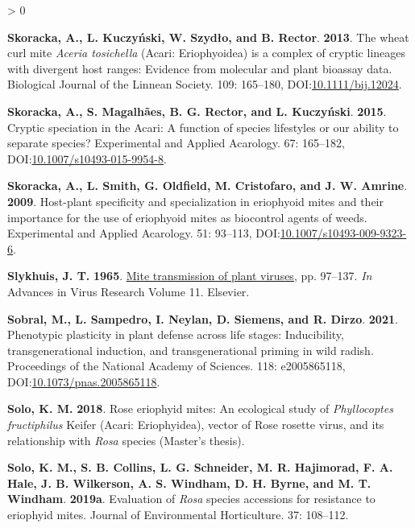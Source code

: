 \documentclass{ufdissertation}[overrideChapters] %
\newlength{\cslhangindent}
\newenvironment{CSLReferences}[2] %
 {%
  \setlength{\parindent}{0pt}
  \ifodd #1 \everypar{\setlength{\hangindent}{\cslhangindent}}\ignorespaces\fi
  \ifnum #2 > 0
  \setlength{\parskip}{#2\baselineskip}
  \fi
 }%
 {}
\begin{document}
{\begin{CSLReferences}{1}{1}
\leavevmode{}%
\textbf{Skoracka, A., L. Kuczyński, W. Szydło, and B. Rector}. \textbf{2013}. The wheat curl mite {\emph{Aceria tosichella}} ({Acari: Eriophyoidea}) is a complex of cryptic lineages with divergent host ranges: Evidence from molecular and plant bioassay data. Biological Journal of the Linnean Society. 109: 165--180, DOI:\href{https://doi.org/10.1111/bij.12024}{10.1111/bij.12024}.

\leavevmode{}%
\textbf{Skoracka, A., S. Magalhães, B. G. Rector, and L. Kuczyński}. \textbf{2015}. Cryptic speciation in the {Acari}: A function of species lifestyles or our ability to separate species? Experimental and Applied Acarology. 67: 165--182, DOI:\href{https://doi.org/10.1007/s10493-015-9954-8}{10.1007/s10493-015-9954-8}.

\leavevmode{}%
\textbf{Skoracka, A., L. Smith, G. Oldfield, M. Cristofaro, and J. W. Amrine}. \textbf{2009}. Host-plant specificity and specialization in eriophyoid mites and their importance for the use of eriophyoid mites as biocontrol agents of weeds. Experimental and Applied Acarology. 51: 93--113, DOI:\href{https://doi.org/10.1007/s10493-009-9323-6}{10.1007/s10493-009-9323-6}.

\leavevmode{}%
\textbf{Slykhuis, J. T.} \textbf{1965}. \href{https://doi.org/10.1016/s0065-3527(08)60544-8}{Mite transmission of plant viruses}, pp. 97--137. \emph{In} Advances in Virus Research Volume 11. Elsevier.

\leavevmode{}%
\textbf{Sobral, M., L. Sampedro, I. Neylan, D. Siemens, and R. Dirzo}. \textbf{2021}. Phenotypic plasticity in plant defense across life stages: Inducibility, transgenerational induction, and transgenerational priming in wild radish. Proceedings of the National Academy of Sciences. 118: e2005865118, DOI:\href{https://doi.org/10.1073/pnas.2005865118}{10.1073/pnas.2005865118}.

\leavevmode{}%
\textbf{Solo, K. M.} \textbf{2018}. Rose eriophyid mites: An ecological study of {\emph{Phyllocoptes fructiphilus}} {Keifer} {({Acari}: {Eriophyidea})}, vector of {Rose rosette virus}, and its relationship with {\emph{Rosa}} species (Master's thesis).

\leavevmode{}%
\textbf{Solo, K. M., S. B. Collins, L. G. Schneider, M. R. Hajimorad, F. A. Hale, J. B. Wilkerson, A. S. Windham, D. H. Byrne, and M. T. Windham}. \textbf{2019a}. Evaluation of {\emph{Rosa}} species accessions for resistance to eriophyid mites. Journal of Environmental Horticulture. 37: 108--112.


\end{CSLReferences}}
\end{document}
